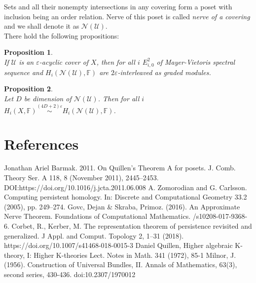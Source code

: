 \documentclass[a4paper, 12pt]{article}
\newtheorem{proposition}{Proposition}
\theoremstyle{definition}
\theoremstyle{remark}
\newcommand{\define}[1]{{\textit{#1}}}
\begin{document}
Sets and all their nonempty intersections in any covering form a poset with inclusion being an order relation. Nerve of this poset is called \define{nerve of a covering} and we shall denote it as $\mathcal{N}(\mathcal{U})$.\\

There hold the following propositions:

\begin{proposition} {\cite[Corollary 5.2]{GS16}}\\
  If $\mathcal{U}$ is an $\varepsilon$-acyclic cover of $X$, then for all $i$ $E^2_{i,0}$ of Mayer-Vietoris spectral sequence and $H_{i}(\mathcal{N}(\mathcal{U}),\mathbb{F})$ are $2\varepsilon$-interleaved as graded modules.
\end{proposition}

\begin{proposition} {\cite[Theorem 7.1]{GS16}}\\
  Let $D$ be dimension of $\mathcal{N}(\mathcal{U})$. Then for all $i$ $H_i(X,\mathbb{F}) \stackrel{(4D+2)\varepsilon}{\sim} H_i(\mathcal{N}(\mathcal{U}),\mathbb{F})$.
\end{proposition}

\section{References}

\begin{enumerate}
  Jonathan Ariel Barmak. 2011.
  \newblock On Quillen’s Theorem A for posets.
  \newblock J. Comb. Theory Ser. A 118, 8 (November 2011), 2445–2453.
  \newblock DOI:https://doi.org/10.1016/j.jcta.2011.06.008
  A. Zomorodian and G. Carlsson.
  \newblock Computing persistent homology.
  \newblock In: Discrete and Computational Geometry 33.2 (2005), pp. 249–274.
  Govc, Dejan \& Skraba, Primoz. (2016).
  \newblock An Approximate Nerve Theorem.
  \newblock Foundations of Computational Mathematics.
  /s10208-017-9368-6.
  Corbet, R., Kerber, M.
  \newblock The representation theorem of persistence revisited and generalized.
  \newblock J Appl. and Comput. Topology 2, 1–31 (2018).
  \newblock https://doi.org/10.1007/s41468-018-0015-3
  Daniel Quillen,
  \newblock Higher algebraic K-theory, I: Higher K-theories Lect.
  \newblock Notes in Math. 341 (1972), 85-1
  Milnor, J. (1956).
  \newblock Construction of Universal Bundles, II.
  \newblock Annals of Mathematics, 63(3), second series, 430-436.
  \newblock doi:10.2307/1970012
\end{enumerate}
\end{document}
